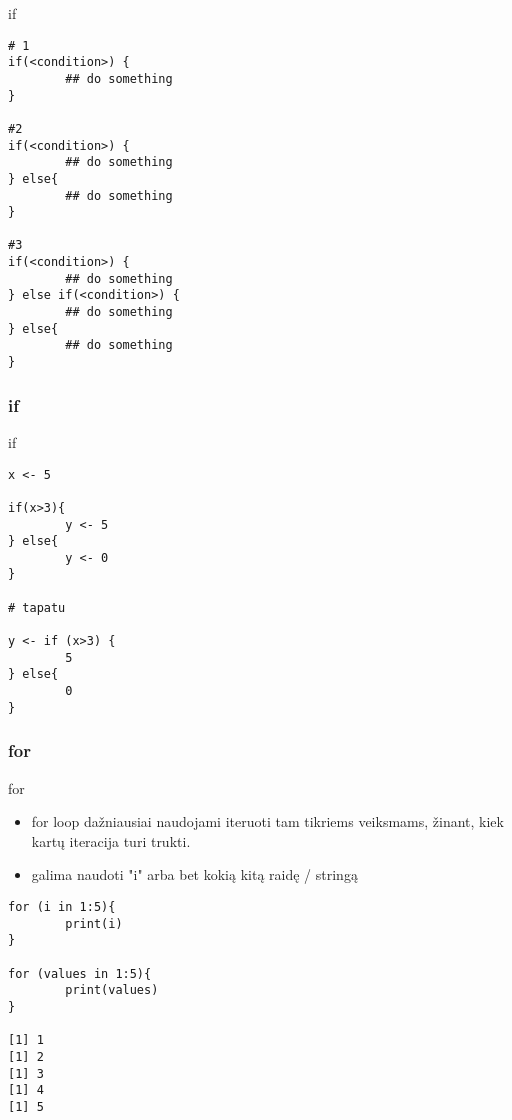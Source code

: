 \documentclass[11pt,xcolor=table]{beamer}
\begin{document}
\begin{frame}[fragile]{if}

\begin{lstlisting}
# 1
if(<condition>) {
        ## do something
} 

#2
if(<condition>) {
        ## do something
} else{
        ## do something
}

#3
if(<condition>) {
        ## do something
} else if(<condition>) {
        ## do something
} else{
        ## do something
}
\end{lstlisting}
\end{frame}

\subsubsection{if}

\begin{frame}[fragile]{if}

\begin{lstlisting}
x <- 5

if(x>3){
        y <- 5
} else{
        y <- 0
}

# tapatu

y <- if (x>3) {
        5
} else{
        0
}

\end{lstlisting}
\end{frame}

\subsubsection{for}

\begin{frame}[fragile]{for}
\begin{itemize}
\item for loop dažniausiai naudojami iteruoti tam tikriems veiksmams, žinant, kiek kartų iteracija turi trukti.
\item galima naudoti "i" arba bet kokią kitą raidę / stringą
\end{itemize}
\begin{lstlisting}
for (i in 1:5){
        print(i)
}

for (values in 1:5){
        print(values)
}

[1] 1
[1] 2
[1] 3
[1] 4
[1] 5


\end{lstlisting}
\end{frame}
\end{document}
